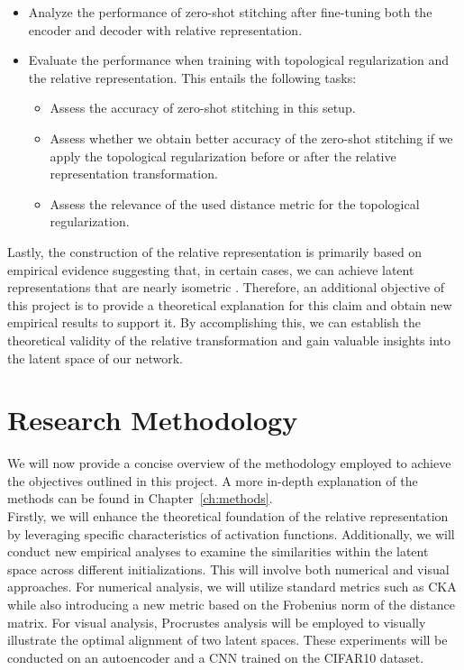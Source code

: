 \documentclass[../main.tex]{subfiles}
\begin{document}
\begin{itemize}
    \item Analyze the performance of zero-shot stitching after fine-tuning both the encoder and decoder with relative representation.
    
    \item Evaluate the performance when training with topological regularization and the relative representation. This entails the following tasks:

    \begin{itemize}        
        \item Assess the accuracy of zero-shot stitching in this setup.

        \item Assess whether we obtain better accuracy of the zero-shot stitching if we apply the topological regularization before or after the relative representation transformation.

        \item Assess the relevance of the used distance metric for the topological regularization.
    \end{itemize}
\end{itemize}

Lastly, the construction of the relative representation is primarily based on empirical evidence suggesting that, in certain cases, we can achieve latent representations that are nearly isometric \cite{moschella_relative_2022}. Therefore, an additional objective of this project is to provide a theoretical explanation for this claim and obtain new empirical results to support it. By accomplishing this, we can establish the theoretical validity of the relative transformation and gain valuable insights into the latent space of our network.


\section{Research Methodology}
We will now provide a concise overview of the methodology employed to achieve the objectives outlined in this project. A more in-depth explanation of the methods can be found in Chapter~\ref{ch:methods}.\\

Firstly,  we will enhance the theoretical foundation of the relative representation by leveraging specific characteristics of activation functions. Additionally, we will conduct new empirical analyses to examine the similarities within the latent space across different initializations. This will involve both numerical and visual approaches. For numerical analysis, we will utilize standard metrics such as CKA while also introducing a new metric based on the Frobenius norm of the distance matrix. For visual analysis, Procrustes analysis will be employed to visually illustrate the optimal alignment of two latent spaces. These experiments will be conducted on an autoencoder and a CNN trained on the CIFAR10 dataset.\\
\end{document}
